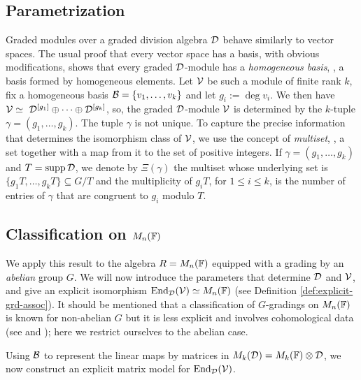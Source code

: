\subsection{Parametrization}


Graded modules over a graded division algebra $\mathcal D$ behave similarly to vector spaces. The usual proof that every vector space has a basis, with obvious modifications, shows that every graded $\mathcal D$-module has a \emph{homogeneous basis}, \ie, a basis formed by homogeneous elements.
Let $\mathcal V$ be such a module of finite rank $k$, fix a homogeneous basis $\mathcal B = \{v_1, \ldots, v_k\}$ and let $g_i := \operatorname{deg} v_i$. We then have $\mc{V}\iso \ \D^{[g_1]}\oplus\cdots\oplus\D^{[g_k]}$, so, the graded $\mathcal D$-module $\mathcal V$ is determined by the $k$-tuple $\gamma = (g_1,\ldots, g_k)$. The tuple $\gamma$ is not unique. To capture the precise information that determines the isomorphism class of $\mathcal V$, we use the concept of \emph{multiset}, \ie, a set together with a map from it to the set of positive integers. If $\gamma = (g_1,\ldots, g_k)$ and $T=\operatorname{supp} \mathcal{D}$, we denote by $\Xi(\gamma)$ the multiset whose underlying set is $\{g_1 T,\ldots, g_k T\} \subseteq G/T$ and the multiplicity of $g_i T$, for $1\leq i\leq k$, is the number of entries of $\gamma$ that are congruent to $g_i$ modulo $T$.

\subsection{Classification on $M_n(\mathbb{F})$}

We apply this result to the algebra $R=M_n(\mathbb{F})$ equipped with a grading by an \emph{abelian} group $G$. We will now introduce the parameters that determine
$\mathcal D$ and $\mathcal V$, and give an explicit isomorphism $\operatorname{End}_{\mathcal{D}} (\mathcal V)\simeq M_n(\mathbb{F})$ (see Definition \ref{def:explicit-grd-assoc}). It should be mentioned that a classification of $G$-gradings on $M_n(\mathbb{F})$ is known for non-abelian $G$ but it is less explicit and involves cohomological data (see \cite[Corollary 2.22]{livromicha} and \cite[Theorem 1.3]{GS}); here we restrict ourselves to the abelian case.

Using $\mathcal B$ to represent the linear maps by matrices in $M_k(\mathcal{D}) = M_k(\mathbb{F})\otimes \mathcal{D}$, we now construct an explicit matrix model for $\operatorname{End}_{\mathcal{D}}(\mathcal V)$.

